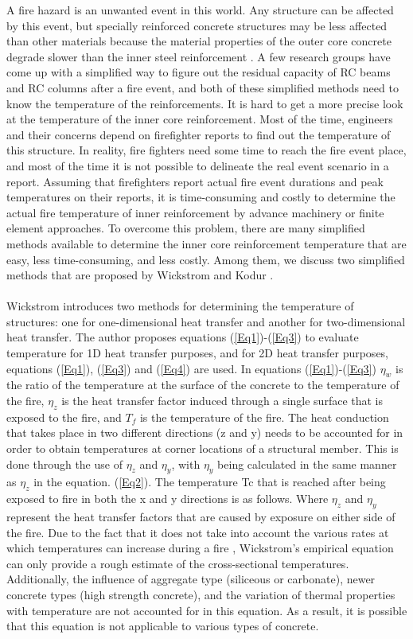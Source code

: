 \documentclass[12pt, letterpaper, oneside]{report}
\begin{document}
A fire hazard is an unwanted event in this world. Any structure can be affected by this event, but specially reinforced concrete structures may be less affected than other materials because the material properties of the outer core concrete degrade slower than the inner steel reinforcement \cite{R6}. A few research groups have come up with a simplified way to figure out the residual capacity of RC beams \cite{R1,R5} and RC columns \cite{R4} after a fire event, and both of these simplified methods need to know the temperature of the reinforcements. It is hard to get a more precise look at the temperature of the inner core reinforcement. Most of the time, engineers and their concerns depend on firefighter reports to find out the temperature of this structure. In reality, fire fighters need some time to reach the fire event place, and most of the time it is not possible to delineate the real event scenario in a report. Assuming that firefighters report actual fire event durations and peak temperatures on their reports, it is time-consuming and costly to determine the actual fire temperature of inner reinforcement by advance machinery or finite element approaches. To overcome this problem, there are many simplified methods available to determine the inner core reinforcement temperature that are easy, less time-consuming, and less costly. Among them, we discuss two simplified methods that are proposed by Wickstrom \cite{R3} and Kodur \cite{R2}.\\
\\
Wickstrom \cite{R3} introduces two methods for determining the temperature of structures: one for one-dimensional heat transfer and another for two-dimensional heat transfer. The author proposes equations (\ref{Eq1})-(\ref{Eq3}) to evaluate temperature for 1D heat transfer purposes, and for 2D heat transfer purposes, equations (\ref{Eq1}), (\ref{Eq3}) and (\ref{Eq4}) are used. In equations (\ref{Eq1})-(\ref{Eq3}) \(\eta_w\) is the ratio of the temperature at the surface of the concrete to the temperature of the fire, \(\eta_z\) is the heat transfer factor induced through a single surface that is exposed to the fire, and \(T_f\) is the temperature of the fire. The heat conduction that takes place in two different directions (z and y) needs to be accounted for in order to obtain temperatures at corner locations of a structural member. This is done through the use of \(\eta_z\) and \(\eta_y\), with \(\eta_y\) being calculated in the same manner as \(\eta_z\) in the equation. (\ref{Eq2}). The temperature Tc that is reached after being exposed to fire in both the x and y directions is as follows. Where \(\eta_z\) and \(\eta_y\) represent the heat transfer factors that are caused by exposure on either side of the fire. Due to the fact that it does not take into account the various rates at which temperatures can increase during a fire \cite{R7}, Wickstrom's empirical equation can only provide a rough estimate of the cross-sectional temperatures. Additionally, the influence of aggregate type (siliceous or carbonate), newer concrete types (high strength concrete), and the variation of thermal properties with temperature are not accounted for in this equation. As a result, it is possible that this equation is not applicable to various types of concrete.
\end{document}
